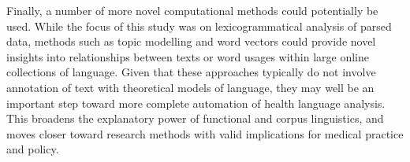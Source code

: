 \documentclass{article}
\begin{document}
Finally, a number of more novel computational methods could potentially be used. While the focus of this study was on lexicogrammatical analysis of parsed data, methods such as topic modelling and word vectors could provide novel insights into relationships between texts or word usages within large online collections of language. Given that these approaches typically do not involve annotation of text with theoretical models of language, they may well be an important step toward more complete automation of health language analysis. This broadens the explanatory power of functional and corpus linguistics, and moves closer toward research methods with valid implications for medical practice and policy.

\printbibliography[heading=bibintoc]
\end{document}
